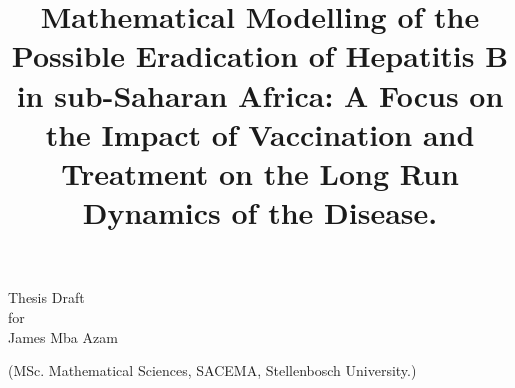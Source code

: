 \begin{titlepage}
		\title{Mathematical Modelling of the Possible Eradication of Hepatitis B in sub-Saharan Africa: A Focus on the Impact of Vaccination and Treatment on the Long Run Dynamics of the Disease.}
		\maketitle
		\begin{center}
			Thesis Draft\\ for\\ James Mba Azam\\
		\end{center}
		\begin{center}
			(MSc. Mathematical Sciences, SACEMA, Stellenbosch University.)
		\end{center}
\end{titlepage}
